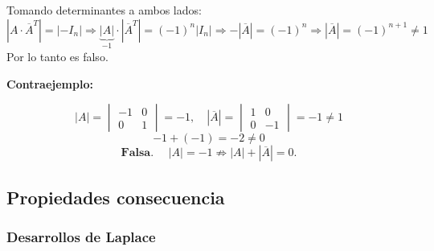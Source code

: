 \documentclass[a4paper,12pt]{article}
\begin{document}
\begin{ejercicio}[title=Ejercicio 42 (⋆)]
Tomando determinantes a ambos lados:
\[
|A \cdot \overline{A}^T| = |-I_n|
\Rightarrow
\underbrace{|A|}_{-1} \cdot |\overline{A}^T| = (-1)^n |I_n|
\Rightarrow
-|\overline{A}| = (-1)^n
\Rightarrow
|\overline{A}| = (-1)^{n+1} \ne 1
\]
Por lo tanto es falso.

\vspace{0.5em}
\textbf{Contraejemplo:}

\[
|A| = \begin{vmatrix}-1 & 0 \\ 0 & 1\end{vmatrix} = -1, \quad
|\overline{A}| = \begin{vmatrix}1 & 0 \\ 0 & -1\end{vmatrix} = -1 \neq 1
\]
\[
-1 + (-1) = -2 \ne 0
\]
\[
\boxed{\textbf{Falsa. }\quad |A| = -1 \not\Rightarrow |A| + |\overline{A}| = 0.}
\]
\end{ejercicio}

\subsection{Propiedades consecuencia}

\subsubsection{Desarrollos de Laplace}
\end{document}
